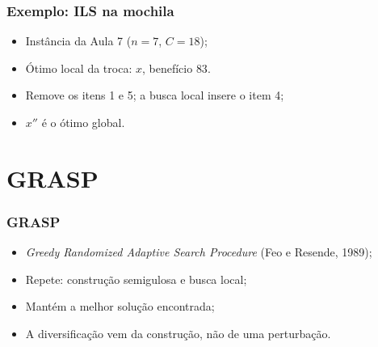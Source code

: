 \documentclass[fleqn]{beamer}
\newcommand{\vetor}[2]{%
	\foreach \v [count=\i] in {#2}{%
		\node[bit\v] at (\i*0.65,#1) {\v};
	}%
}
\newcommand{\destaque}[2]{%
	\draw[red,very thick] ({#2*0.65-0.3},{#1-0.3}) rectangle ({#2*0.65+0.3},{#1+0.3});
}
\begin{document}
\begin{frame}
	\frametitle{Exemplo: ILS na mochila}
	\begin{itemize}
		\item Instância da Aula 7 ($n = 7$, $C = 18$);
		\item Ótimo local da troca: $x$, benefício $83$.
	\end{itemize}
	\vspace{1mm}
	\begin{center}
	\end{center}
	\begin{itemize}
		\item Remove os itens 1 e 5; a busca local insere o item 4;
		\item $x''$ é o ótimo global.
	\end{itemize}
\end{frame}

\section{GRASP}

\begin{frame}
	\frametitle{GRASP}
	\begin{itemize}
		\item \textit{Greedy Randomized Adaptive Search Procedure}
			(Feo e Resende, 1989);
		\item Repete: construção semigulosa e busca local;
		\item Mantém a melhor solução encontrada;
		\item A diversificação vem da construção, não de uma perturbação.
	\end{itemize}
\end{frame}
\end{document}

